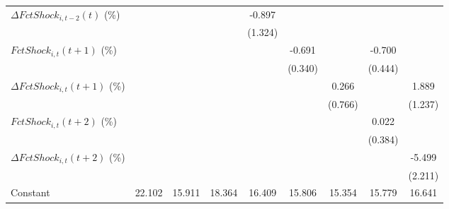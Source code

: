 {\begin{tabular}{l*{8}{c}}
\addlinespace
$ \Delta FctShock_{i,t-2}(t)$ (\%)&                     &                     &                     &      -0.897         &                     &                     &                     &                     \\
                    &                     &                     &                     &     (1.324)         &                     &                     &                     &                     \\
\addlinespace
$ FctShock_{i,t}(t+1)$ (\%)&                     &                     &                     &                     &      -0.691\sym{*}  &                     &      -0.700         &                     \\
                    &                     &                     &                     &                     &     (0.340)         &                     &     (0.444)         &                     \\
\addlinespace
$ \Delta FctShock_{i,t}(t+1)$ (\%)&                     &                     &                     &                     &                     &       0.266         &                     &       1.889         \\
                    &                     &                     &                     &                     &                     &     (0.766)         &                     &     (1.237)         \\
\addlinespace
$ FctShock_{i,t}(t+2)$ (\%)&                     &                     &                     &                     &                     &                     &       0.022         &                     \\
                    &                     &                     &                     &                     &                     &                     &     (0.384)         &                     \\
\addlinespace
$ \Delta FctShock_{i,t}(t+2)$ (\%)&                     &                     &                     &                     &                     &                     &                     &      -5.499\sym{**} \\
                    &                     &                     &                     &                     &                     &                     &                     &     (2.211)         \\
\addlinespace
Constant            &      22.102\sym{***}&      15.911\sym{***}&      18.364\sym{***}&      16.409\sym{***}&      15.806\sym{***}&      15.354\sym{***}&      15.779\sym{***}&      16.641\sym{***}\\

\end{tabular}}
